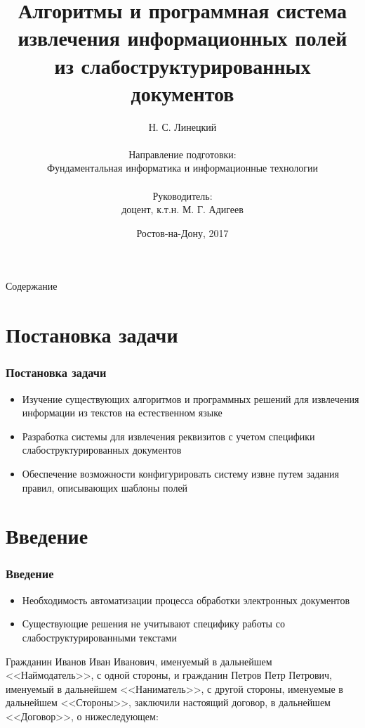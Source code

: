 \documentclass{beamer}
\begin{document}
\title[Алгоритмы извлечения полей]{Алгоритмы и программная система извлечения информационных полей из слабоструктурированных документов}
\author{Н. С. Линецкий\\
\ \\
Направление подготовки:\\
Фундаментальная информатика и информационные технологии\\
\ \\
Руководитель:\\
доцент, к.т.н. М. Г. Адигеев}
\date{Ростов-на-Дону, 2017} 

{
	\begin{frame}
		\titlepage
	\end{frame}
}

\begin{frame}{Содержание}
\tableofcontents
\end{frame}

\section{Постановка задачи}
\begin{frame}
\frametitle{Постановка задачи}
\begin{itemize}
	\item Изучение существующих алгоритмов и программных решений для извлечения информации из текстов на естественном языке
	\item Разработка системы для извлечения реквизитов с учетом специфики слабоструктурированных документов
	\item Обеспечение возможности конфигурировать систему извне путем задания правил, описывающих шаблоны полей
\end{itemize}
\end{frame}

\section{Введение}
\begin{frame}
\frametitle{Введение}
\begin{itemize}
	\item Необходимость автоматизации процесса обработки электронных документов
	\item Существующие решения не учитывают специфику работы со слабоструктурированными текстами
\end{itemize}
\begin{example}
Гражданин Иванов Иван Иванович, именуемый в дальнейшем <<Наймодатель>>, с одной стороны, и гражданин Петров Петр Петрович, именуемый в дальнейшем <<Наниматель>>, с другой стороны, именуемые в дальнейшем <<Стороны>>, заключили настоящий договор, в дальнейшем <<Договор>>, о нижеследующем:
\end{example}
\end{frame}
\end{document}

